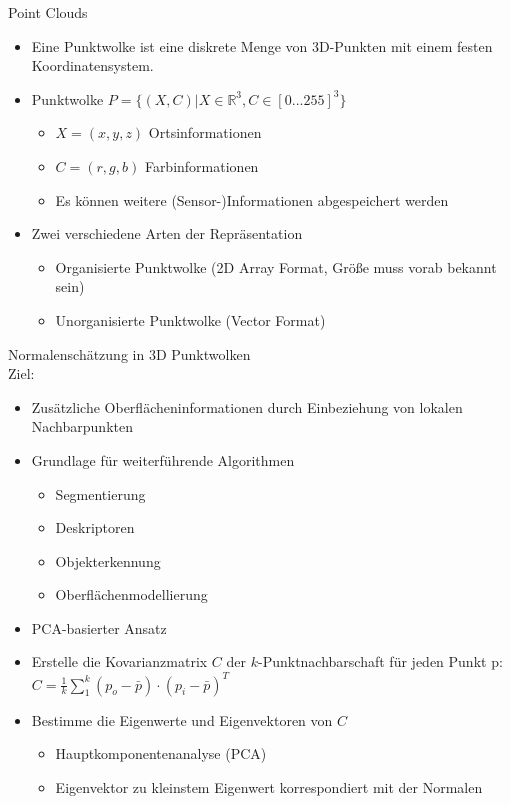 \documentclass[paper=a4, fontsize=11pt]{scrartcl} %
\numberwithin{equation}{section} %
\numberwithin{figure}{section} %
\numberwithin{table}{section} %
\begin{document}
Point Clouds
\begin{itemize}
\item Eine Punktwolke ist eine diskrete Menge von 3D-Punkten mit einem festen Koordinatensystem.
\item Punktwolke $P = \{(X,C)|X \in \mathbb{R}^3, C \in [0...255]^3\}$
\begin{itemize}
\item $X = (x,y,z)$ Ortsinformationen
\item $C = (r,g,b)$ Farbinformationen
\item Es können weitere (Sensor-)Informationen abgespeichert werden
\end{itemize}
\item Zwei verschiedene Arten der Repräsentation
\begin{itemize}
\item Organisierte Punktwolke (2D Array Format, Größe muss vorab bekannt sein)
\item Unorganisierte Punktwolke (Vector Format)
\end{itemize}
\end{itemize}

Normalenschätzung in 3D Punktwolken\\ 
Ziel:
\begin{itemize}
\item Zusätzliche Oberflächeninformationen durch Einbeziehung von lokalen Nachbarpunkten
\item Grundlage für weiterführende Algorithmen
\begin{itemize}
\item Segmentierung
\item Deskriptoren
\item Objekterkennung
\item Oberflächenmodellierung
\end{itemize}
\item PCA-basierter Ansatz
\item Erstelle die Kovarianzmatrix $C$ der $k$-Punktnachbarschaft für jeden Punkt p: $C = \frac{1}{k}\sum\limits_1^k (p_o - \bar{p}) \cdot (p_i - \bar{p})^T$
\item Bestimme die Eigenwerte und Eigenvektoren von $C$
\begin{itemize}
\item Hauptkomponentenanalyse (PCA)
\item Eigenvektor zu kleinstem Eigenwert korrespondiert mit der Normalen
\end{itemize}
\end{itemize}
\end{document}
